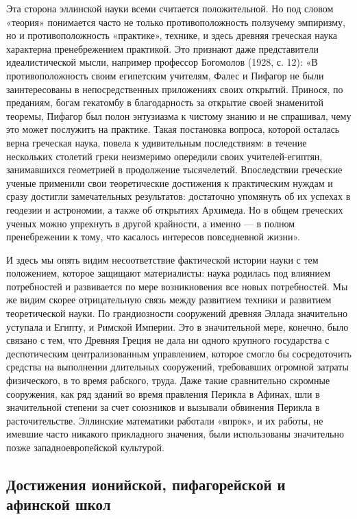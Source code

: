Эта сторона эллинской науки всеми считается положительной. Но под
словом «теория» понимается часто не только противоположность ползучему
эмпиризму, но и противоположность «практике», технике, и здесь древняя
греческая наука характерна пренебрежением практикой. Это признают даже
представители идеалистической мысли, например профессор Богомолов
(1928, с. 12): «В противоположность своим египетским учителям, Фалес
и Пифагор не были заинтересованы в непосредственных приложениях своих
открытий. Принося, по преданиям, богам гекатомбу в благодарность за
открытие своей знаменитой теоремы, Пифагор был полон энтузиазма к
чистому знанию и не спрашивал, чему это может послужить на практике.
Такая постановка вопроса, которой осталась верна греческая наука,
повела к удивительным последствиям: в течение нескольких столетий
греки неизмеримо опередили своих учителей-египтян, занимавшихся
геометрией в продолжение тысячелетий. Впоследствии греческие ученые
применили свои теоретические достижения к практическим нуждам и сразу
достигли замечательных результатов: достаточно упомянуть об их успехах
в геодезии и астрономии, а также об открытиях Архимеда. Но в общем
греческих ученых можно упрекнуть в другой крайности, а именно --- в
полном пренебрежении к тому, что касалось интересов повседневной
жизни».

И здесь мы опять видим несоответствие фактической истории науки с тем
положением, которое защищают материалисты: наука родилась под влиянием
потребностей и развивается по мере возникновения все новых
потребностей. Мы же видим скорее отрицательную связь между развитием
техники и развитием теоретической науки. По грандиозности сооружений
древняя Эллада значительно уступала и Египту, и Римской Империи. Это в
значительной мере, конечно, было связано с тем, что Древняя Греция не
дала ни одного крупного государства с деспотическим централизованным
управлением, которое смогло бы сосредоточить средства на выполнении
длительных сооружений, требовавших огромной затраты физического, в то
время рабского, труда. Даже такие сравнительно скромные сооружения,
как ряд зданий во время правления Перикла в Афинах, шли в значительной
степени за счет союзников и вызывали обвинения Перикла в
расточительстве. Эллинские математики работали «впрок», и их работы,
не имевшие часто никакого прикладного значения, были использованы
значительно позже западноевропейской культурой.

\subsection{Достижения ионийской, пифагорейской и афинской школ}


